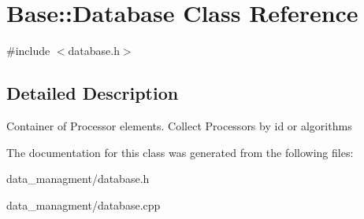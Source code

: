 \hypertarget{classBase_1_1Database}{\section{Base\-:\-:Database Class Reference}
\label{classBase_1_1Database}
}


{\ttfamily \#include $<$database.\-h$>$}



\subsection{Detailed Description}
Container of Processor elements. Collect Processors by id or algorithms 

The documentation for this class was generated from the following files\-:\begin{DoxyCompactItemize}
\item 
data\-\_\-managment/database.\-h\item 
data\-\_\-managment/database.\-cpp\end{DoxyCompactItemize}
